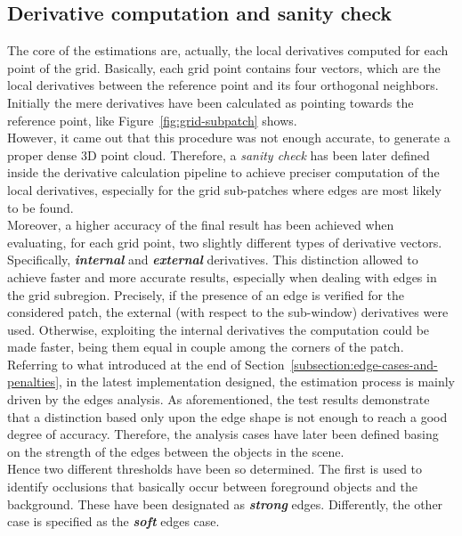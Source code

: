 \subsection{Derivative computation and sanity check}
\label{subsection:derivative-computation}

The core of the estimations are, actually, the local derivatives computed for each point of the grid. 
Basically, each grid point contains four vectors, which are the local derivatives between the reference point and its four orthogonal neighbors. \\
Initially the mere derivatives have been calculated as pointing towards the reference point, like Figure~\ref{fig:grid-subpatch} shows. \\
However, it came out that this procedure was not enough accurate, to generate a proper dense 3D point cloud.
Therefore, a \textit{sanity check} has been later defined inside the derivative calculation pipeline to achieve preciser computation of the local derivatives, especially for the grid sub-patches where edges are most likely to be found.\\
Moreover, a higher accuracy of the final result has been achieved when evaluating, for each grid point, two slightly different types of derivative vectors.
Specifically, \textbf{\textit{internal}} and \textbf{\textit{external}} derivatives. 
This distinction allowed to achieve faster and more accurate results, especially when dealing with edges in the grid subregion. 
Precisely, if the presence of an edge is verified for the considered patch, the external (with respect to the sub-window) derivatives were used.
Otherwise, exploiting the internal derivatives the computation could be made faster, being them equal in couple among the corners of the patch. \\
Referring to what introduced at the end of Section~\ref{subsection:edge-cases-and-penalties}, in the latest implementation designed, the estimation process is mainly driven by the edges analysis. 
As aforementioned, the test results demonstrate that a distinction based only upon the edge shape is not enough to reach a good degree of accuracy.
Therefore, the analysis cases have later been defined basing on the strength of the edges between the objects in the scene.\\
Hence two different thresholds have been so determined. 
The first is used to identify occlusions that basically occur between foreground objects and the background. 
These have been designated as \textbf{\textit{strong}} edges. 
Differently, the other case is specified as the \textbf{\textit{soft}} edges case.
